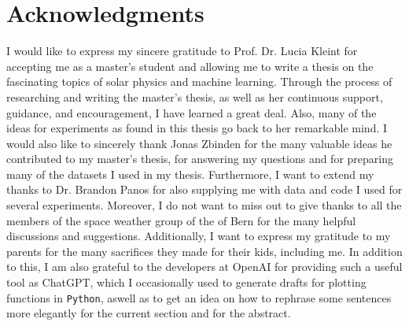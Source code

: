 \documentclass[a4paper,11pt]{report}
\def\fc#1{{\color{black}{#1}}} %
\begin{document}

\chapter*{Acknowledgments}
I would like to express my sincere gratitude to Prof. Dr. Lucia Kleint for accepting me as a master's student and allowing me to write a thesis on the fascinating topics of solar physics and machine learning. Through the process of researching and writing the master's thesis, as well as her continuous support, guidance, and encouragement, I have learned a great deal. Also, many of the ideas for experiments as found in this thesis go back to her remarkable mind. I would also like to sincerely thank Jonas Zbinden for the many valuable ideas he contributed to my master's thesis, for answering my questions and for preparing many of the datasets I used in my thesis. Furthermore, I want to extend my thanks to Dr. Brandon Panos for also supplying me with data and code I used for several experiments. Moreover, I do not want to miss out to give thanks to all the members of the space weather group of the \fc{University} of Bern for the many helpful discussions and suggestions. Additionally, I want to express my gratitude to my parents for the many sacrifices they made for their kids, including me. In addition to this, I am also grateful to the developers at OpenAI for providing such a useful tool as ChatGPT, which I occasionally used to generate drafts for plotting functions in \verb|Python|, aswell as to get an idea on how to rephrase some sentences more elegantly for the current section and for the abstract.
\end{document}
